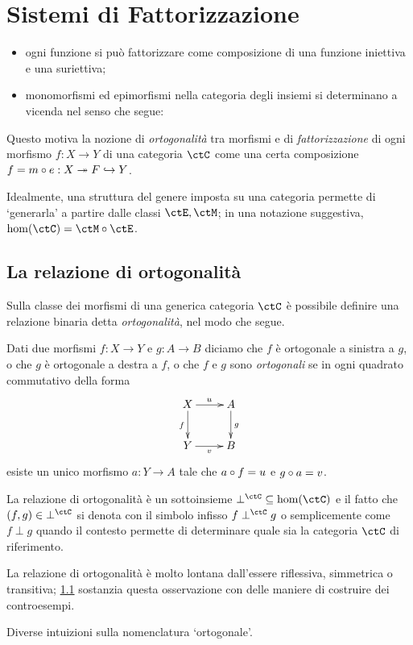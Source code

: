 \chapter{Sistemi di Fattorizzazione}
\begin{itemize}
	\item ogni funzione si può fattorizzare come composizione di una funzione iniettiva e una suriettiva;
	\item monomorfismi ed epimorfismi nella categoria degli insiemi si determinano a vicenda nel senso che segue:
\end{itemize}
Questo motiva la nozione di \emph{ortogonalità} tra morfismi e di \emph{fattorizzazione} di ogni morfismo \(f : X\to Y\) di una categoria \(\ctC\) come una certa composizione \(f = m\circ e : X \twoheadrightarrow F \hookrightarrow Y\).

Idealmente, una struttura del genere imposta su una categoria permette di `generarla' a partire dalle classi \(\ctE,\ctM\); in una notazione suggestiva, \(\hom(\ctC)=\ctM\circ \ctE\).
\section[Ortogonalità]{La relazione di ortogonalità}
Sulla classe dei morfismi di una generica categoria \(\ctC\) è possibile definire una relazione binaria detta \emph{ortogonalità}, nel modo che segue.
\begin{definition}
	Dati due morfismi \(f : X\to Y\) e \(g : A\to B\) diciamo che \(f\) è ortogonale a sinistra a \(g\), o che \(g\) è ortogonale a destra a \(f\), o che \(f\) e \(g\) sono \emph{ortogonali} se in ogni quadrato commutativo della forma
	\[
		\vcenter{\xymatrix{%
				X \ar[r]^u\ar[d]_f & A\ar[d]^g\\
				Y \ar[r]_v & B
			}}\]
	esiste un unico morfismo \(a : Y\to A\) tale che \(a\circ f=u\) e \(g\circ a=v\).
\end{definition}
La relazione di ortogonalità è un sottoinsieme \(\mathbin{\perp^\ctC} \subseteq \hom(\ctC)\) e il fatto che \((f,g)\in \mathbin{\perp^\ctC}\) si denota con il simbolo infisso \(f\perp^\ctC g\) o semplicemente come \(f\perp g\) quando il contesto permette di determinare quale sia la categoria \(\ctC\) di riferimento.

La relazione di ortogonalità è molto lontana dall'essere riflessiva, simmetrica o transitiva; \ref{} sostanzia questa osservazione con delle maniere di costruire dei controesempi.
\begin{remark}\label{perche_ortogonale}
	Diverse intuizioni sulla nomenclatura `ortogonale'.
\end{remark}

